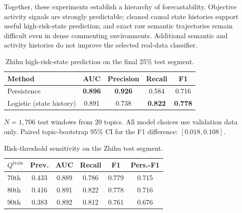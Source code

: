\documentclass[journal]{IEEEtran}
\begin{document}
Together, these experiments establish a hierarchy of forecastability. Objective activity signals are strongly predictable; cleaned causal state histories support useful high-risk-state prediction; and exact raw semantic trajectories remain difficult even in dense commenting environments. Additional semantic and activity histories do not improve the selected real-data classifier.

\begin{table}[H]
\caption{Zhihu high-risk-state prediction on the final 25\% test segment.}\label{tab:real_results}
\centering
\begin{threeparttable}

\begin{tabular}{lcccc}
\toprule
\textbf{Method} & \textbf{AUC} & \textbf{Precision} & \textbf{Recall} & \textbf{F1} \\
\midrule
Persistence & \textbf{0.896} & \textbf{0.926} & 0.584 & 0.716 \\
Logistic (state history) & 0.891 & 0.738 & \textbf{0.822} & \textbf{0.778} \\
\bottomrule
\end{tabular}
\begin{tablenotes}
\item $N=1{,}706$ test windows from 20 topics. All model choices use validation data only. Paired topic-bootstrap 95\% CI for the F1 difference: $[0.018,0.108]$.
\end{tablenotes}
\end{threeparttable}
\end{table}

\begin{table}[H]
\caption{Risk-threshold sensitivity on the Zhihu test segment.}\label{tab:threshold_sensitivity}
\centering
\begin{tabular}{lccccc}
\toprule
$Q^{\mathrm{train}}$ & \textbf{Prev.} & \textbf{AUC} & \textbf{Recall} & \textbf{F1} & \textbf{Pers.-F1} \\
\midrule
70th & 0.433 & 0.889 & 0.786 & 0.779 & 0.715 \\
80th & 0.416 & 0.891 & 0.822 & 0.778 & 0.716 \\
90th & 0.383 & 0.892 & 0.812 & 0.761 & 0.676 \\
\bottomrule
\end{tabular}
\end{table}
\end{document}
